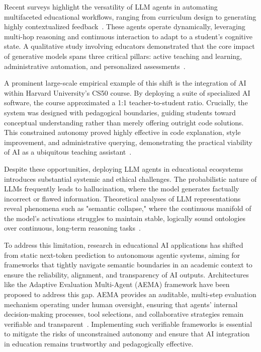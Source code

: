 Recent surveys highlight the versatility of LLM agents in automating multifaceted educational workflows, ranging from curriculum design to generating highly contextualized feedback~\cite{llm_in_edu}. These agents operate dynamically, leveraging multi-hop reasoning and continuous interaction to adapt to a student's cognitive state. A qualitative study involving educators demonstrated that the core impact of generative models spans three critical pillars: active teaching and learning, administrative automation, and personalized assessments~\cite{AI_in_Edu}. 

A prominent large-scale empirical example of this shift is the integration of AI within Harvard University's CS50 course. By deploying a suite of specialized AI software, the course approximated a 1:1 teacher-to-student ratio. Crucially, the system was designed with pedagogical boundaries, guiding students toward conceptual understanding rather than merely offering outright code solutions. This constrained autonomy proved highly effective in code explanation, style improvement, and administrative querying, demonstrating the practical viability of AI as a ubiquitous teaching assistant~\cite{ai_4_CS50}.

Despite these opportunities, deploying LLM agents in educational ecosystems introduces substantial systemic and ethical challenges. The probabilistic nature of LLMs frequently leads to hallucination, where the model generates factually incorrect or flawed information. Theoretical analyses of LLM representations reveal phenomena such as "semantic collapse," where the continuous manifold of the model's activations struggles to maintain stable, logically sound ontologies over continuous, long-term reasoning tasks~\cite{semantic_collapse}. 

To address this limitation, research in educational AI applications has shifted from static next-token prediction to autonomous agentic systems, aiming for frameworks that tightly navigate semantic boundaries in an academic context to ensure the reliability, alignment, and transparency of AI outputs. Architectures like the Adaptive Evaluation Multi-Agent (AEMA) framework have been proposed to address this gap. AEMA provides an auditable, multi-step evaluation mechanism operating under human oversight, ensuring that agents' internal decision-making processes, tool selections, and collaborative strategies remain verifiable and transparent~\cite{AEMA_agentic_eval}. Implementing such verifiable frameworks is essential to mitigate the risks of unconstrained autonomy and ensure that AI integration in education remains trustworthy and pedagogically effective.

